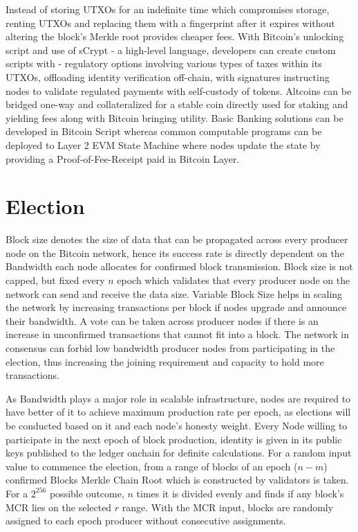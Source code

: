 \documentclass[a4paper,10pt]{article}
\begin{document}
Instead of storing UTXOs for an indefinite time which compromises storage, renting UTXOs and replacing them with a fingerprint after it expires without altering the block's Merkle root provides cheaper fees. With Bitcoin's unlocking script and use of sCrypt - a high-level language, developers can create custom scripts with - regulatory options involving various types of taxes within its UTXOs, offloading identity verification off-chain, with signatures instructing nodes to validate regulated payments with self-custody of tokens. Altcoins can be bridged one-way and collateralized for a stable coin directly used for staking and yielding fees along with Bitcoin bringing utility. Basic Banking solutions can be developed in Bitcoin Script whereas common computable programs can be deployed to Layer 2 EVM State Machine where nodes update the state by providing a Proof-of-Fee-Receipt paid in Bitcoin Layer. 
\section{Election}
Block size denotes the size of data that can be propagated across every producer node on the Bitcoin network, hence its success rate is directly dependent on the Bandwidth each node allocates for confirmed block transmission. Block size is not capped, but fixed every $n$ epoch which validates that every producer node on the network can send and receive the data size. Variable Block Size helps in scaling the network by increasing transactions per block if nodes upgrade and announce their bandwidth. A vote can be taken across producer nodes if there is an increase in unconfirmed transactions that cannot fit into a block. The network in consensus can forbid low bandwidth producer nodes from participating in the election, thus increasing the joining requirement and capacity to hold more transactions. 

As Bandwidth plays a major role in scalable infrastructure, nodes are required to have better of it to achieve maximum production rate per epoch, as elections will be conducted based on it and each node's honesty weight. Every Node willing to participate in the next epoch of block production, identity is given in its public keys published to the ledger onchain for definite calculations. For a random input value to commence the election, from a range of blocks of an epoch ($n-m$) confirmed Blocks Merkle Chain Root which is constructed by validators is taken. For a $2^{256}$ possible outcome, $n$ times it is divided evenly and finds if any block's MCR lies on the selected $r$ range. With the MCR input, blocks are randomly assigned to each epoch producer without consecutive assignments. 
\end{document}
